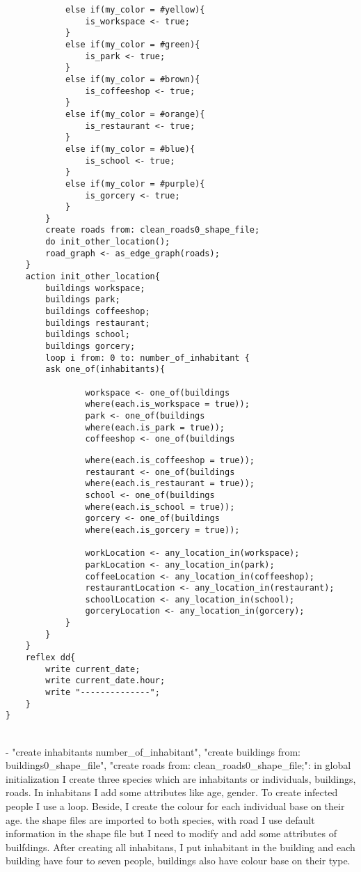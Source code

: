 \documentclass{article}
\begin{document}
\begin{tcolorbox}
\begin{lstlisting}
			else if(my_color = #yellow){
				is_workspace <- true;
			}
			else if(my_color = #green){
				is_park <- true;
			}
			else if(my_color = #brown){
				is_coffeeshop <- true;
			}
			else if(my_color = #orange){
				is_restaurant <- true;
			}
			else if(my_color = #blue){
				is_school <- true;
			}
			else if(my_color = #purple){
				is_gorcery <- true;
			}
		}
		create roads from: clean_roads0_shape_file;
		do init_other_location();
		road_graph <- as_edge_graph(roads);
	}
	action init_other_location{
		buildings workspace;
		buildings park;
		buildings coffeeshop;
		buildings restaurant;
		buildings school;
		buildings gorcery;
		loop i from: 0 to: number_of_inhabitant {
		ask one_of(inhabitants){

				workspace <- one_of(buildings 
				where(each.is_workspace = true));
				park <- one_of(buildings 
				where(each.is_park = true));
				coffeeshop <- one_of(buildings 
\end{lstlisting}
\end{tcolorbox}
\begin{tcolorbox}
\begin{lstlisting}
				where(each.is_coffeeshop = true));
				restaurant <- one_of(buildings 
				where(each.is_restaurant = true));
				school <- one_of(buildings 
				where(each.is_school = true));
				gorcery <- one_of(buildings 
				where(each.is_gorcery = true));
				
				workLocation <- any_location_in(workspace);
				parkLocation <- any_location_in(park);
				coffeeLocation <- any_location_in(coffeeshop);
				restaurantLocation <- any_location_in(restaurant);
				schoolLocation <- any_location_in(school);
				gorceryLocation <- any_location_in(gorcery);
			}
		}
	}
	reflex dd{
		write current_date;
		write current_date.hour;
		write "--------------";
	}
}
\end{lstlisting}
\end{tcolorbox}
\\[1\baselineskip]
- "create inhabitants number\_of\_inhabitant", "create buildings from: buildings0\_shape\_file", "create roads from: clean\_roads0\_shape\_file;": in global initialization I create three species which are inhabitants or individuals, buildings, roads. In inhabitans I add some attributes like age, gender. To create infected people I use a loop. Beside, I create the colour for each individual base on their age. the shape files are imported to both species, with road I use default information in the shape file but I need to modify and add some attributes of builfdings. After creating all inhabitans, I put inhabitant in the building and each building have four to seven people, buildings also have colour base on their type.
\end{document}
